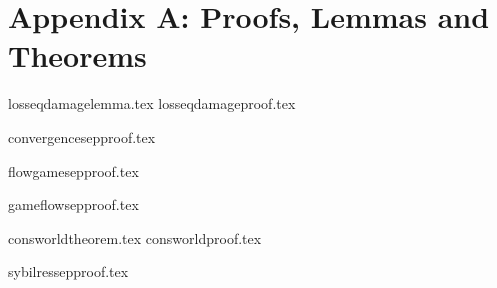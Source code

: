 \section*{Appendix A: Proofs, Lemmas and Theorems}
  {losseqdamagelemma.tex}
  {losseqdamageproof.tex}

  {convergencesepproof.tex}

  {flowgamesepproof.tex}

  {gameflowsepproof.tex}

  {consworldtheorem.tex}
  {consworldproof.tex}

  {sybilressepproof.tex}

